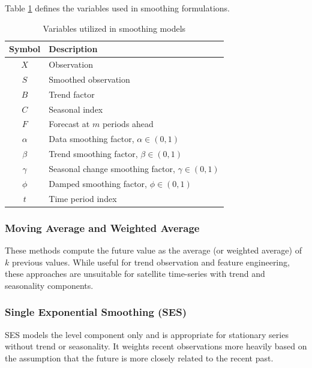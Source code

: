 \documentclass{article} %
\begin{document}
        Table \ref{tab:t2} defines the variables used in smoothing formulations.

        \begin{table}[h]
        \centering
        \caption{Variables utilized in smoothing models}
        \label{tab:t2}
        \renewcommand{\arraystretch}{1.4}
            \begin{tabular}{|c|l|}
            \hline
            \textbf{Symbol} & \textbf{Description} \\
            \hline
            $X$ & Observation \\
            $S$ & Smoothed observation \\
            $B$ & Trend factor \\
            $C$ & Seasonal index \\
            $F$ & Forecast at $m$ periods ahead \\
            $\alpha$ & Data smoothing factor, $\alpha \in (0,1)$ \\
            $\beta$ & Trend smoothing factor, $\beta \in (0,1)$ \\
            $\gamma$ & Seasonal change smoothing factor, $\gamma \in (0,1)$ \\
            $\phi$ & Damped smoothing factor, $\phi \in (0,1)$ \\
            $t$ & Time period index \\
            \hline
            \end{tabular}
        \end{table}

        \subsubsection{Moving Average and Weighted Average}
            These methods compute the future value as the average (or weighted average) of $k$ previous values. While useful for trend observation and feature engineering, these approaches are unsuitable for satellite time-series with trend and seasonality components.

        \subsubsection{Single Exponential Smoothing (SES)}
            SES models the level component only and is appropriate for stationary series without trend or seasonality. It weights recent observations more heavily based on the assumption that the future is more closely related to the recent past.
\end{document}
